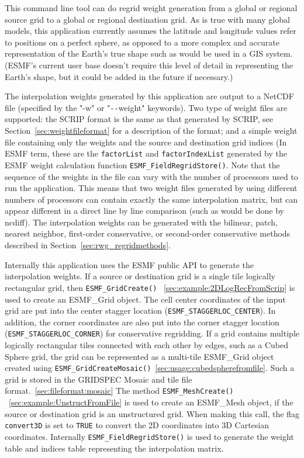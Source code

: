 This command line tool can do regrid weight generation from a global or regional source grid to a global or regional destination grid.
As is true with many global models, this application currently assumes the latitude and longitude values refer to positions on a perfect sphere, as opposed to a more complex and accurate representation of the Earth's true shape such as would be used in a GIS system. (ESMF's current user base doesn't require this level of detail in representing the Earth's shape, but it could be added in the future if necessary.)

The interpolation weights generated by this application are output to a NetCDF file (specified by the "-w" or "\verb+--+weight"
keywords). Two type of weight files are supported: the SCRIP format is the same as that generated by SCRIP, see Section~\ref{sec:weightfileformat} for a description of the format; and a simple weight file containing only the weights and the source and destination grid indices (In ESMF
term, these are the {\tt factorList} and {\tt factorIndexList} generated by the ESMF weight calculation function {\tt ESMF\_FieldRegridStore()}.
Note that the sequence of the weights in the file can
vary with the number of processors used to run the application. This means that two weight files generated by using different
numbers of processors can contain exactly the same interpolation matrix, but can appear different in a direct line by line
comparison (such as would be done by ncdiff). The interpolation weights can be generated with
the bilinear, patch, nearest neighbor, first-order conservative, or second-order conservative methods described in Section~\ref{sec:rwg_regridmethods}.

        
Internally this application uses the ESMF public API to generate the interpolation weights.
If a source or destination grid is a single tile logically rectangular grid, then {\tt ESMF\_GridCreate()}
~\ref{sec:example:2DLogRecFromScrip}
is used to create an ESMF\_Grid object. The cell center
coordinates of the input grid are put into the center stagger location ({\tt ESMF\_STAGGERLOC\_CENTER}).
In addition, the corner coordinates are also put into the corner stagger location
({\tt ESMF\_STAGGERLOC\_CORNER}) for conservative regridding.  If a grid contains multiple logically rectangular tiles 
connected with each other by edges, such as a Cubed Sphere grid, the grid can be represented as a multi-tile ESMF\_Grid object created 
using {\tt ESMF\_GridCreateMosaic()}~\ref{sec:usage:cubedspherefromfile}. Such a grid is stored in the GRIDSPEC Mosaic and tile file format.~\ref{sec:fileformat:mosaic}
The method {\tt ESMF\_MeshCreate()} ~\ref{sec:example:UnstructFromFile}
is used to create an ESMF\_Mesh object, if the
source or destination grid is an unstructured grid. When making this call,
the flag {\tt convert3D} is set to {\tt TRUE} to convert the 2D coordinates into 3D Cartesian coordinates. 
Internally {\tt ESMF\_FieldRegridStore()} is used to generate the weight table and indices table representing the interpolation matrix.


